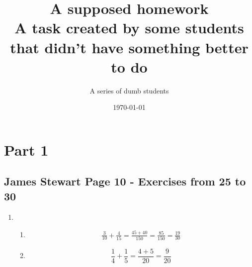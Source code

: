 \documentclass{article}
\title{
	A supposed homework \\
	\large A task created by some students that didn't have something better to do
}
\author{A series of dumb students}
\date{\today}
\begin{document}
\maketitle

\section{Part 1}
\subsection{James Stewart Page 10  -  Exercises from 25 to 30}

\begin{enumerate}
	\item
	      \begin{enumerate}
		      \item
		            \begin{align*}
			            \frac{3}{10}  +  \frac{4}{15} = \frac{45 + 40}{150}
			            = \frac{85}{150}  = \frac{19}{30}
		            \end{align*}
		      \item
		            \[ \frac{1}{4}  +  \frac{1}{5}  = \frac{4  +  5}{20}  = \frac{9}{20} \]
	      \end{enumerate}


\end{enumerate}
\end{document}
